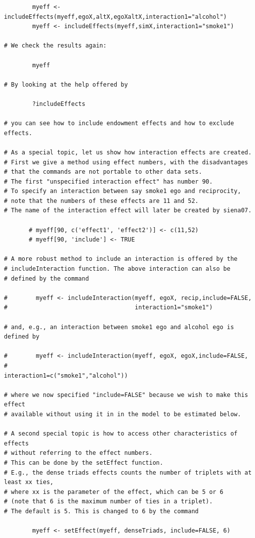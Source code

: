 \documentclass[a4paper,fleqn]{article}
\newcommand{\+}{\, + \,}
\begin{document}
{\begin{verbatim}
        myeff <- includeEffects(myeff,egoX,altX,egoXaltX,interaction1="alcohol")
        myeff <- includeEffects(myeff,simX,interaction1="smoke1")

# We check the results again:

        myeff

# By looking at the help offered by

        ?includeEffects

# you can see how to include endowment effects and how to exclude effects.

# As a special topic, let us show how interaction effects are created.
# First we give a method using effect numbers, with the disadvantages
# that the commands are not portable to other data sets.
# The first "unspecified interaction effect" has number 90.
# To specify an interaction between say smoke1 ego and reciprocity,
# note that the numbers of these effects are 11 and 52.
# The name of the interaction effect will later be created by siena07.

       # myeff[90, c('effect1', 'effect2')] <- c(11,52)
       # myeff[90, 'include'] <- TRUE

# A more robust method to include an interaction is offered by the
# includeInteraction function. The above interaction can also be
# defined by the command

#        myeff <- includeInteraction(myeff, egoX, recip,include=FALSE,
#                                    interaction1="smoke1")

# and, e.g., an interaction between smoke1 ego and alcohol ego is defined by

#        myeff <- includeInteraction(myeff, egoX, egoX,include=FALSE,
#                                    interaction1=c("smoke1","alcohol"))

# where we now specified "include=FALSE" because we wish to make this effect
# available without using it in in the model to be estimated below.

# A second special topic is how to access other characteristics of effects
# without referring to the effect numbers.
# This can be done by the setEffect function.
# E.g., the dense triads effects counts the number of triplets with at least xx ties,
# where xx is the parameter of the effect, which can be 5 or 6
# (note that 6 is the maximum number of ties in a triplet).
# The default is 5. This is changed to 6 by the command

        myeff <- setEffect(myeff, denseTriads, include=FALSE, 6)


\end{verbatim}}
\end{document}
